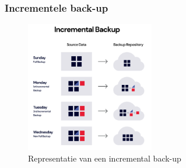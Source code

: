 \subsubsection{Incrementele back-up}
\begin{figure}[h] 
    \centering
    \captionsetup{justification=centering}
    \includegraphics[width=0.5\textwidth]{img/incrementb.png}  
    \caption{Representatie van een incremental back-up \autocite{Rivas2022}}   
    \label{fig:incrback-up}           
\end{figure}

